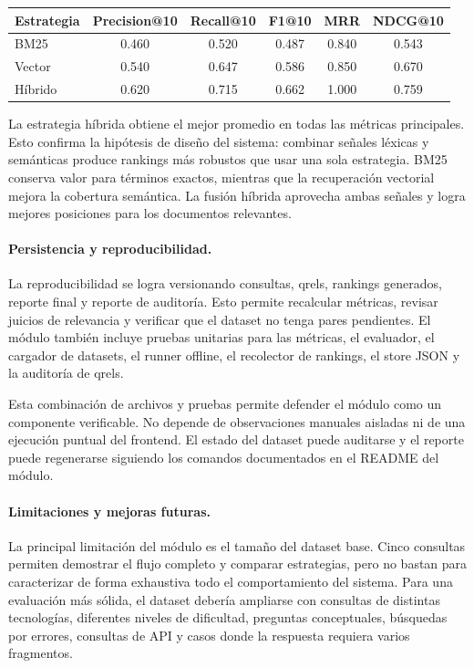 \documentclass[11pt]{article}
\begin{document}
\begin{center}
\begin{tabular}{lccccc}
\toprule
Estrategia & Precision@10 & Recall@10 & F1@10 & MRR & NDCG@10 \\
\midrule
BM25 & 0.460 & 0.520 & 0.487 & 0.840 & 0.543 \\
Vector & 0.540 & 0.647 & 0.586 & 0.850 & 0.670 \\
Híbrido & 0.620 & 0.715 & 0.662 & 1.000 & 0.759 \\
\bottomrule
\end{tabular}
\end{center}

La estrategia híbrida obtiene el mejor promedio en todas las métricas principales. Esto confirma la hipótesis de diseño del sistema: combinar señales léxicas y semánticas produce rankings más robustos que usar una sola estrategia. BM25 conserva valor para términos exactos, mientras que la recuperación vectorial mejora la cobertura semántica. La fusión híbrida aprovecha ambas señales y logra mejores posiciones para los documentos relevantes.

\paragraph{Persistencia y reproducibilidad.}
La reproducibilidad se logra versionando consultas, qrels, rankings generados, reporte final y reporte de auditoría. Esto permite recalcular métricas, revisar juicios de relevancia y verificar que el dataset no tenga pares pendientes. El módulo también incluye pruebas unitarias para las métricas, el evaluador, el cargador de datasets, el runner offline, el recolector de rankings, el store JSON y la auditoría de qrels.

Esta combinación de archivos y pruebas permite defender el módulo como un componente verificable. No depende de observaciones manuales aisladas ni de una ejecución puntual del frontend. El estado del dataset puede auditarse y el reporte puede regenerarse siguiendo los comandos documentados en el README del módulo.

\paragraph{Limitaciones y mejoras futuras.}
La principal limitación del módulo es el tamaño del dataset base. Cinco consultas permiten demostrar el flujo completo y comparar estrategias, pero no bastan para caracterizar de forma exhaustiva todo el comportamiento del sistema. Para una evaluación más sólida, el dataset debería ampliarse con consultas de distintas tecnologías, diferentes niveles de dificultad, preguntas conceptuales, búsquedas por errores, consultas de API y casos donde la respuesta requiera varios fragmentos.
\end{document}
